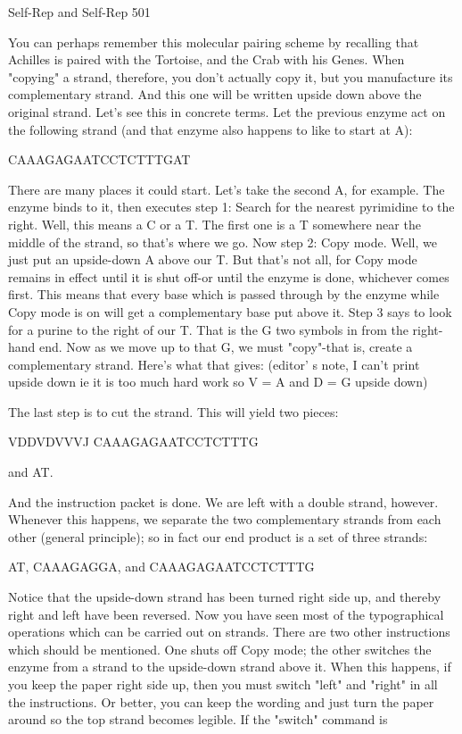 {Self-Rep and Self-Rep                                                                       501

You can perhaps remember this molecular pairing scheme by recalling that Achilles is paired
with the Tortoise, and the Crab with his Genes.
        When "copying" a strand, therefore, you don't actually copy it, but you manufacture
its complementary strand. And this one will be written upside down above the original strand.
Let's see this in concrete terms. Let the previous enzyme act on the following strand (and that
enzyme also happens to like to start at A):

                              CAAAGAGAATCCTCTTTGAT

There are many places it could start. Let's take the second A, for example. The enzyme binds
to it, then executes step 1: Search for the nearest pyrimidine to the right. Well, this means a C
or a T. The first one is a T somewhere near the middle of the strand, so that's where we go.
Now step 2: Copy mode. Well, we just put an upside-down A above our T. But that's not all,
for Copy mode remains in effect until it is shut off-or until the enzyme is done, whichever
comes first. This means that every base which is passed through by the enzyme while Copy
mode is on will get a complementary base put above it. Step 3 says to look for a purine to the
right of our T. That is the G two symbols in from the right-hand end. Now as we move up to
that G, we must "copy"-that is, create a complementary strand. Here's what that gives:
(editor’ s note, I can’t print upside down ie it is too much hard work so V = A and D = G
upside down)




The last step is to cut the strand. This will yield two pieces:

                                        VDDVDVVVJ
                                CAAAGAGAATCCTCTTTG

                                             and AT.

And the instruction packet is done. We are left with a double strand, however. Whenever this
happens, we separate the two complementary strands from each other (general principle); so
in fact our end product is a set of three strands:

                AT, CAAAGAGGA,             and CAAAGAGAATCCTCTTTG

Notice that the upside-down strand has been turned right side up, and thereby right and left
have been reversed.
         Now you have seen most of the typographical operations which can be carried out on
strands. There are two other instructions which should be mentioned. One shuts off Copy
mode; the other switches the enzyme from a strand to the upside-down strand above it. When
this happens, if you keep the paper right side up, then you must switch "left" and "right" in all
the instructions. Or better, you can keep the wording and just turn the paper around so the top
strand becomes legible. If the "switch" command is




}
